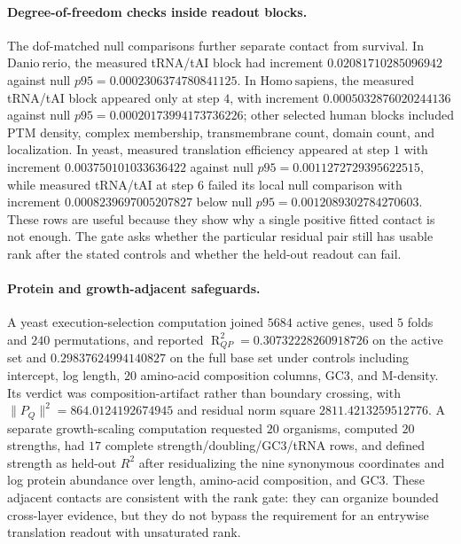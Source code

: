 \paragraph{Degree-of-freedom checks inside readout blocks.}
The dof-matched null comparisons further separate contact from survival. In $\mathrm{Danio\ rerio}$, the measured tRNA/tAI block had increment $0.02081710285096942$ against null $p95=0.0002306374780841125$. In $\mathrm{Homo\ sapiens}$, the measured tRNA/tAI block appeared only at step $4$, with increment $0.0005032876020244136$ against null $p95=0.00020173994173736226$; other selected human blocks included PTM density, complex membership, transmembrane count, domain count, and localization. In yeast, measured translation efficiency appeared at step $1$ with increment $0.003750101033636422$ against null $p95=0.0011272729395622515$, while measured tRNA/tAI at step $6$ failed its local null comparison with increment $0.0008239697005207827$ below null $p95=0.0012089302784270603$. These rows are useful because they show why a single positive fitted contact is not enough. The gate asks whether the particular residual pair still has usable rank after the stated controls and whether the held-out readout can fail.

\paragraph{Protein and growth-adjacent safeguards.}
A yeast execution-selection computation joined $5684$ active genes, used $5$ folds and $240$ permutations, and reported $\operatorname{R}^2_{QP}=0.30732228260918726$ on the active set and $0.29837624994140827$ on the full base set under controls including intercept, log length, $20$ amino-acid composition columns, GC3, and M-density. Its verdict was composition-artifact rather than boundary crossing, with $\|P_Q\|^2=864.0124192674945$ and residual norm square $2811.4213259512776$. A separate growth-scaling computation requested $20$ organisms, computed $20$ strengths, had $17$ complete strength/doubling/GC3/tRNA rows, and defined strength as held-out $R^2$ after residualizing the nine synonymous coordinates and log protein abundance over length, amino-acid composition, and GC3. These adjacent contacts are consistent with the rank gate: they can organize bounded cross-layer evidence, but they do not bypass the requirement for an entrywise translation readout with unsaturated rank.


